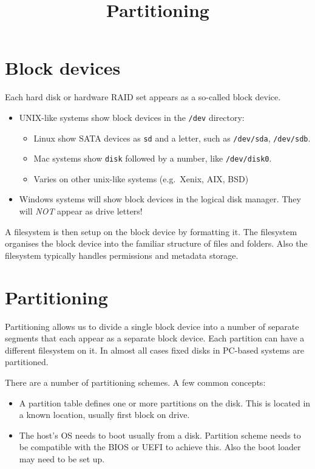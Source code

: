 \documentclass[slides]{pgnotes}
\title{Partitioning}
\begin{document}
\maketitle

\tableofcontents

\section{Block devices}
\label{sec:block-devices}

Each hard disk or hardware RAID set appears as a so-called block device.

\begin{itemize}
\item
  UNIX-like systems show block devices in the \texttt{/dev} directory:

  \begin{itemize}
  \item
    Linux show SATA devices as \texttt{sd} and a letter, such as
    \texttt{/dev/sda}, \texttt{/dev/sdb}.
  \item
    Mac systems show \texttt{disk} followed by a number, like
    \texttt{/dev/disk0}.
  \item
    Varies on other unix-like systems (e.g.~Xenix, AIX, BSD)
  \end{itemize}
\item
  Windows systems will show block devices in the logical disk manager.
  They will \emph{NOT} appear as drive letters!
\end{itemize}

A filesystem is then setup on the block device by formatting it. The
filesystem organises the block device into the familiar structure of
files and folders. Also the filesystem typically handles permissions and
metadata storage.

\section{Partitioning}
\label{sec:partitioning}

Partitioning allows us to divide a single block device into a number of
separate segments that each appear as a separate block device. Each
partition can have a different filesystem on it. In almost all cases
fixed disks in PC-based systems are partitioned.

There are a number of partitioning schemes. A few common concepts:

\begin{itemize}
\item
  A partition table defines one or more partitions on the disk. This is
  located in a known location, usually first block on drive.
\item
  The host's OS needs to boot usually from a disk. Partition scheme
  needs to be compatible with the BIOS or UEFI to achieve this. Also the
  boot loader may need to be set up.
\end{itemize}
\end{document}
